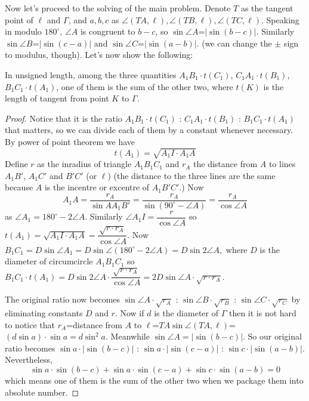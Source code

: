 \documentclass[11pt,a4paper]{article}
\begin{document}
\begin{enumerate}
	
	Now let's proceed to the solving of the main problem. Denote $T$ as the tangent point of $\ell$ and $\Gamma$, and $a,b,c$ as $\angle (TA,\ell),\angle (TB,\ell),\angle (TC,\ell)$. Speaking in modulo $180^{\circ}$, $\angle A$ is congruent to $b-c$, so $\sin\angle A$=$|\sin (b-c)|$. Similarly $\sin\angle B$=$|\sin (c-a)|$ and $\sin\angle C$=$|\sin (a-b)|.$ (we can change the $\pm$ sign to modulus, though).
	Let's now show the following: 
	
	\begin{lemma}
		In unsigned length, 
		among the three quantities 
		$A_1B_1\cdot t(C_1)$, $C_1A_1\cdot t(B_1)$, $B_1C_1\cdot t(A_1)$, 
		one of them is the sum of the other two, 
		where $t(K)$ is the length of tangent from point $K$ to $\Gamma$.
	\end{lemma}
	
	\begin{proof}
		Notice that it is the ratio $A_1B_1\cdot t(C_1)$ : $C_1A_1\cdot t(B_1)$ : $B_1C_1\cdot t(A_1)$ that matters, so we can divide each of them by a constant whenever necessary.
		By power of point theorem we have 
		\[t(A_1)=\sqrt {A_1I\cdot A_1A}\] 
		Define $r$ as the inradius of triangle $A_1B_1C_1$ and $r_A$ the distance from $A$ to lines $A_1B'$, $A_1C'$ and $B'C'$ (or $\ell$) (the distance to the three lines are the same because $A$ is the incentre or excentre of $A_1B'C'$.)
		Now 
		\[A_1A=\dfrac{r_A}{\sin AA_1B'}=\dfrac{r_A}{\sin (90^{\circ}-\angle A)}=\dfrac{r_A}{\cos \angle A}\]
		as $\angle A_1=180^{\circ}-2\angle A.$ Similarly $\angle A_1I=\dfrac{r}{\cos \angle A}$ so $t(A_1)=\sqrt {A_1I\cdot A_1A}=\dfrac{\sqrt{r\cdot r_A}}{\cos \angle A}$. Now $B_1C_1=D\sin\angle A_1=D\sin\angle (180^{\circ}-2\angle A)=D\sin 2\angle A,$ where $D$ is the diameter of circumcircle $A_1B_1C_1$ so $B_1C_1\cdot t(A_1)=D\sin 2\angle A\cdot \dfrac{\sqrt{r\cdot r_A}}{\cos \angle A}=2D\sin \angle A\cdot\sqrt{r\cdot r_A}.$ 
		
		The original ratio now becomes $\sin \angle A\cdot\sqrt{r_A}$ : $\sin \angle B\cdot\sqrt{r_B}$ : $\sin \angle C\cdot\sqrt{r_C}$ by eliminating constants $D$ and $r$. Now if $d$ is the diameter of $\Gamma$ then it is not hard to notice that $r_A$=distance from $A$ to $\ell$=$TA\sin\angle (TA,\ell)$=$(d\sin a)\cdot\sin a=d\sin^{2} a.$ Meanwhile $\sin\angle A=|\sin (b-c)|.$ So our original ratio becomes $\sin a\cdot|\sin (b-c)|$ : $\sin a\cdot|\sin (c-a)|$ : $\sin c\cdot|\sin (a-b)|$. 
		Nevertheless, 
		\[
		\sin a\cdot\sin (b-c)+\sin a\cdot\sin (c-a)+\sin c\cdot\sin (a-b)=0
		\]
		which means one of them is the sum of the other two when we package them into absolute number. 
	\end{proof}
	

\end{enumerate}
\end{document}
